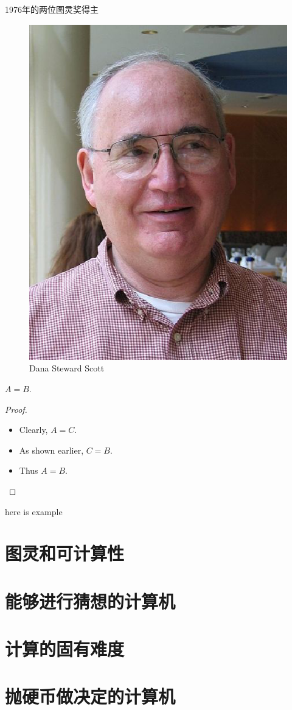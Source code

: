 \documentclass{beamer}
\begin{document}
\begin{frame}{1976年的两位图灵奖得主}
\begin{figure}[htbp]
\begin{minipage}{0.4\textwidth}
		\includegraphics[scale=0.3]{figures/sct.eps}
		\caption*{Dana Steward Scott}
	\end{minipage}
\end{figure}
\end{frame}

\begin{frame}
  \begin{theorem}
    $A = B$.
  \end{theorem}
  \begin{proof}
    \begin{itemize}
    \item Clearly, $A = C$.\pause
    \item As shown earlier,  $C = B$.\pause
    \item Thus $A = B$.\pause
    \end{itemize}
  \end{proof}
  \begin{example}
  here is example
  \end{example}
\end{frame}

\section{图灵和可计算性}
\section{能够进行猜想的计算机}
\section{计算的固有难度}
\section{抛硬币做决定的计算机}
\end{document}
